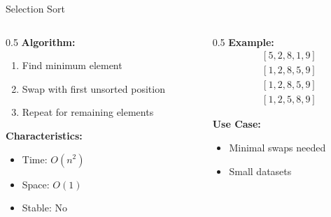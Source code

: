 \documentclass[aspectratio=169,xcolor=dvipsnames]{beamer}
\begin{document}
\begin{frame}{Selection Sort}
  \begin{columns}
    \begin{column}{0.5\textwidth}
      \textbf{Algorithm:}
      \begin{enumerate}
        \item Find minimum element
        \item Swap with first unsorted position
        \item Repeat for remaining elements
      \end{enumerate}

      \vspace{0.3cm}
      \textbf{Characteristics:}
      \begin{itemize}
        \item Time: $O(n^2)$
        \item Space: $O(1)$
        \item Stable: No
      \end{itemize}
    \end{column}

    \begin{column}{0.5\textwidth}
      \textbf{Example:}
      \begin{align*}
        &[5, 2, 8, 1, 9] \\
        &[1, 2, 8, 5, 9] \\
        &[1, 2, 8, 5, 9] \\
        &[1, 2, 5, 8, 9]
      \end{align*}

      \vspace{0.3cm}
      \textbf{Use Case:}
      \begin{itemize}
        \item Minimal swaps needed
        \item Small datasets
      \end{itemize}
    \end{column}
  \end{columns}
\end{frame}
\end{document}
